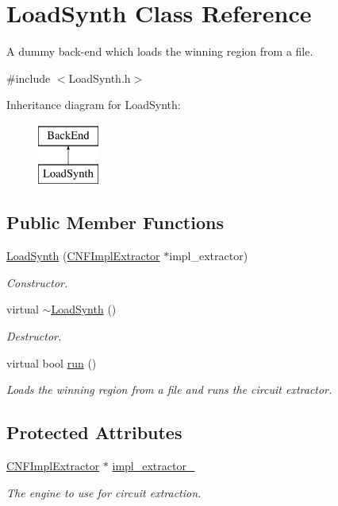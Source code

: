 \hypertarget{classLoadSynth}{\section{Load\-Synth Class Reference}
\label{classLoadSynth}
}


A dummy back-\/end which loads the winning region from a file.  




{\ttfamily \#include $<$Load\-Synth.\-h$>$}

Inheritance diagram for Load\-Synth\-:\begin{figure}[H]
\begin{center}
\leavevmode
\includegraphics[height=2.000000cm]{classLoadSynth}
\end{center}
\end{figure}
\subsection*{Public Member Functions}
\begin{DoxyCompactItemize}
\item 
\hyperlink{classLoadSynth_a5eb6d14f9a84c77be3b73d43cf76c42a}{Load\-Synth} (\hyperlink{classCNFImplExtractor}{C\-N\-F\-Impl\-Extractor} $\ast$impl\-\_\-extractor)
\begin{DoxyCompactList}\small\item\em Constructor. \end{DoxyCompactList}\item 
virtual \hyperlink{classLoadSynth_a92cd166ef07407f54857e15dc33daada}{$\sim$\-Load\-Synth} ()
\begin{DoxyCompactList}\small\item\em Destructor. \end{DoxyCompactList}\item 
virtual bool \hyperlink{classLoadSynth_a555ce9c74ad3143254f7a1d1cce094b0}{run} ()
\begin{DoxyCompactList}\small\item\em Loads the winning region from a file and runs the circuit extractor. \end{DoxyCompactList}\end{DoxyCompactItemize}
\subsection*{Protected Attributes}
\begin{DoxyCompactItemize}
\item 
\hyperlink{classCNFImplExtractor}{C\-N\-F\-Impl\-Extractor} $\ast$ \hyperlink{classLoadSynth_aadb78c2e1fec1038d1a2f850a2c984f2}{impl\-\_\-extractor\-\_\-}
\begin{DoxyCompactList}\small\item\em The engine to use for circuit extraction. \end{DoxyCompactList}\end{DoxyCompactItemize}
